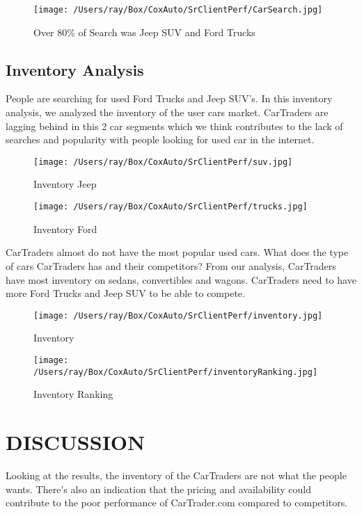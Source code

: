 \documentclass[
	12pt, %
	letterpaper, %
]{tPlate}
\begin{document}
\begin{figure}[H]
	\centering
	\texttt{[image: /Users/ray/Box/CoxAuto/SrClientPerf/CarSearch.jpg]}
	\caption[Optional caption]{Over 80\% of Search was Jeep SUV and Ford Trucks}
	\label{fig. 6}
\end{figure}

\subsection{Inventory Analysis}
People are searching for used Ford Trucks and Jeep SUV's. In this inventory analysis, we analyzed the inventory of the user cars market.  CarTraders are lagging behind in this 2 car segments which we think contributes to the lack of searches and popularity with people looking for used car in the internet.

\begin{figure}[H]
	\centering
	\texttt{[image: /Users/ray/Box/CoxAuto/SrClientPerf/suv.jpg]}
	\caption[Optional caption]{Inventory Jeep}
	\label{fig. 7}
\end{figure}

\begin{figure}[H]
	\centering
	\texttt{[image: /Users/ray/Box/CoxAuto/SrClientPerf/trucks.jpg]}
	\caption[Optional caption]{Inventory Ford}
	\label{fig. 8}
\end{figure}

CarTraders almost do not have the most popular used cars. What does the type of cars CarTraders has and their competitors? From our analysis, CarTraders have most inventory on sedans, convertibles and wagons.  CarTraders need to have more Ford Trucks and Jeep SUV to be able to compete.

\begin{figure}[H]
	\centering
	\texttt{[image: /Users/ray/Box/CoxAuto/SrClientPerf/inventory.jpg]}
	\caption[Optional caption]{Inventory}
	\label{fig. 9}
\end{figure}

\begin{figure}[H]
	\centering
	\texttt{[image: /Users/ray/Box/CoxAuto/SrClientPerf/inventoryRanking.jpg]}
	\caption[Optional caption]{Inventory Ranking}
	\label{fig. 10}
\end{figure}
\cleardoublepage
\section{DISCUSSION}
Looking at the results, the inventory of the CarTraders are not what the people wants.  There's also an indication that the pricing and availability could contribute to the poor performance of CarTrader.com compared to competitors.\\
\end{document}

